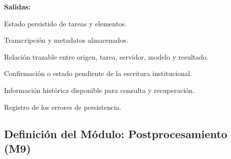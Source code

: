\begin{definicionmodulo}
\textbf{Salidas:}
\begin{elementosmodulo}
    \item Estado persistido de tareas y elementos.
    \item Transcripción y metadatos almacenados.
    \item Relación trazable entre origen, tarea, servidor, modelo y resultado.
    \item Confirmación o estado pendiente de la escritura institucional.
    \item Información histórica disponible para consulta y recuperación.
    \item Registro de los errores de persistencia.
\end{elementosmodulo}

\end{definicionmodulo}



\subsection{Definición del Módulo: Postprocesamiento (M9)}
\label{subsec:modulo_m9}


